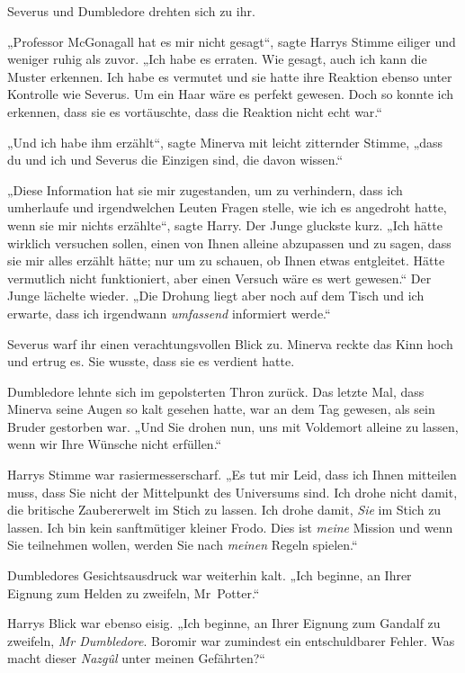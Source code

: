Severus und Dumbledore drehten sich zu ihr. 

„Professor McGonagall hat es mir nicht gesagt“, sagte Harrys Stimme eiliger und weniger ruhig als zuvor. „Ich habe es erraten. Wie gesagt, auch ich kann die Muster erkennen. Ich habe es vermutet und sie hatte ihre Reaktion ebenso unter Kontrolle wie Severus. Um ein Haar wäre es perfekt gewesen. Doch so konnte ich erkennen, dass sie es vortäuschte, dass die Reaktion nicht echt war.“ 

„Und ich habe ihm erzählt“, sagte Minerva mit leicht zitternder Stimme, „dass du und ich und Severus die Einzigen sind, die davon wissen.“ 

„Diese Information hat sie mir zugestanden, um zu verhindern, dass ich umherlaufe und irgendwelchen Leuten Fragen stelle, wie ich es angedroht hatte, wenn sie mir nichts erzählte“, sagte Harry. Der Junge gluckste kurz. „Ich hätte wirklich versuchen sollen, einen von Ihnen alleine abzupassen und zu sagen, dass sie mir alles erzählt hätte; nur um zu schauen, ob Ihnen etwas entgleitet. Hätte vermutlich nicht funktioniert, aber einen Versuch wäre es wert gewesen.“ Der Junge lächelte wieder. „Die Drohung liegt aber noch auf dem Tisch und ich erwarte, dass ich irgendwann \emph{umfassend} informiert werde.“ 

Severus warf ihr einen verachtungsvollen Blick zu. Minerva reckte das Kinn hoch und ertrug es. Sie wusste, dass sie es verdient hatte. 

Dumbledore lehnte sich im gepolsterten Thron zurück. Das letzte Mal, dass Minerva seine Augen so kalt gesehen hatte, war an dem Tag gewesen, als sein Bruder gestorben war. „Und Sie drohen nun, uns mit Voldemort alleine zu lassen, wenn wir Ihre Wünsche nicht erfüllen.“ 

Harrys Stimme war rasiermesserscharf. „Es tut mir Leid, dass ich Ihnen mitteilen muss, dass Sie nicht der Mittelpunkt des Universums sind. Ich drohe nicht damit, die britische Zaubererwelt im Stich zu lassen. Ich drohe damit, \emph{Sie} im Stich zu lassen. Ich bin kein sanftmütiger kleiner Frodo. Dies ist \emph{meine} Mission und wenn Sie teilnehmen wollen, werden Sie nach \emph{meinen} Regeln spielen.“ 

Dumbledores Gesichtsausdruck war weiterhin kalt. „Ich beginne, an Ihrer Eignung zum Helden zu zweifeln, Mr~Potter.“ 

Harrys Blick war ebenso eisig. „Ich beginne, an Ihrer Eignung zum Gandalf zu zweifeln, \emph{Mr Dumbledore}. Boromir war zumindest ein entschuldbarer Fehler. Was macht dieser \emph{Nazgûl} unter meinen Gefährten?“ 

